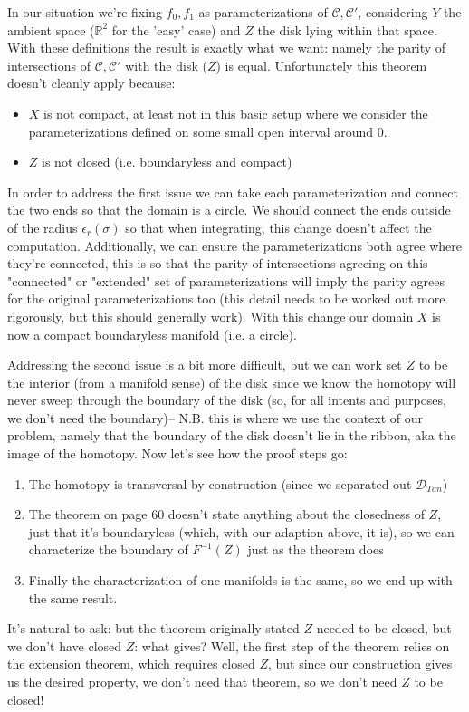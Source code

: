 \documentclass{article}
\newcommand{\R}[1]{\mathbb{R}^{#1}}
\newcommand{\C}{\mathcal{C}}
\begin{document}
In our situation we're fixing $f_0, f_1$ as parameterizations of $\C, \C'$, considering $Y$ the ambient space ($\R{2}$ for the 'easy' case) and $Z$ the disk lying within that space. With these definitions the result is exactly what we want: namely the parity of intersections of $\C,\C'$ with the disk ($Z$) is equal. Unfortunately this theorem doesn't cleanly apply because:
\begin{itemize}
  \item $X$ is not compact, at least not in this basic setup where we consider the parameterizations defined on some small open interval around $0$.
  \item $Z$ is not closed (i.e. boundaryless and compact)
\end{itemize}
In order to address the first issue we can take each parameterization and connect the two ends so that the domain is a circle. We should connect the ends outside of the radius $\epsilon_r(\sigma)$ so that when integrating, this change doesn't affect the computation. Additionally, we can ensure the parameterizations both agree where they're connected, this is so that the parity of intersections agreeing on this "connected" or "extended" set of parameterizations will imply the parity agrees for the original parameterizations too (this detail needs to be worked out more rigorously, but this should generally work). With this change our domain $X$ is now a compact boundaryless manifold (i.e. a circle).

Addressing the second issue is a bit more difficult, but we can work set $Z$ to be the interior (from a manifold sense) of the disk since we know the homotopy will never sweep through the boundary of the disk (so, for all intents and purposes, we don't need the boundary)-- N.B. this is where we use the context of our problem, namely that the boundary of the disk doesn't lie in the ribbon, aka the image of the homotopy. Now let's see how the proof steps go:
\begin{enumerate}
  \item The homotopy is transversal by construction (since we separated out $\mathcal{D}_{Tan}$)
  \item The theorem on page 60 doesn't state anything about the closedness of $Z$, just that it's boundaryless (which, with our adaption above, it is), so we can characterize the boundary of $F^{-1}(Z)$ just as the theorem does
  \item Finally the characterization of one manifolds is the same, so we end up with the same result.
\end{enumerate}
It's natural to ask: but the theorem originally stated $Z$ needed to be closed, but we don't have closed $Z$: what gives? Well, the first step of the theorem relies on the extension theorem, which requires closed $Z$, but since our construction gives us the desired property, we don't need that theorem, so we don't need $Z$ to be closed!

\end{document}
